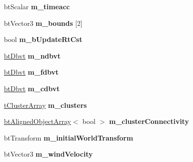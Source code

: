 \begin{DoxyCompactItemize}
\item 
\hypertarget{classbt_soft_body_a3be50e0cde03af244eb7103a45ed52c3}{bt\+Scalar {\bfseries m\+\_\+timeacc}}\label{classbt_soft_body_a3be50e0cde03af244eb7103a45ed52c3}

\item 
\hypertarget{classbt_soft_body_a8e821d5ed921ec7fe4919d39123d1022}{bt\+Vector3 {\bfseries m\+\_\+bounds} \mbox{[}2\mbox{]}}\label{classbt_soft_body_a8e821d5ed921ec7fe4919d39123d1022}

\item 
\hypertarget{classbt_soft_body_a04af20a0326f6ebe8cf0901beb39c2fa}{bool {\bfseries m\+\_\+b\+Update\+Rt\+Cst}}\label{classbt_soft_body_a04af20a0326f6ebe8cf0901beb39c2fa}

\item 
\hypertarget{classbt_soft_body_aff100eec6044f78bbc4f7e5ccf4619d3}{\hyperlink{structbt_dbvt}{bt\+Dbvt} {\bfseries m\+\_\+ndbvt}}\label{classbt_soft_body_aff100eec6044f78bbc4f7e5ccf4619d3}

\item 
\hypertarget{classbt_soft_body_ab4ca8f3ddef99e2068818d6fabbad321}{\hyperlink{structbt_dbvt}{bt\+Dbvt} {\bfseries m\+\_\+fdbvt}}\label{classbt_soft_body_ab4ca8f3ddef99e2068818d6fabbad321}

\item 
\hypertarget{classbt_soft_body_a108b2be76b7647b2138d99e99b3bbdb0}{\hyperlink{structbt_dbvt}{bt\+Dbvt} {\bfseries m\+\_\+cdbvt}}\label{classbt_soft_body_a108b2be76b7647b2138d99e99b3bbdb0}

\item 
\hypertarget{classbt_soft_body_a9579ec7fb7f43787cf4bc74eed279f48}{\hyperlink{classbt_aligned_object_array}{t\+Cluster\+Array} {\bfseries m\+\_\+clusters}}\label{classbt_soft_body_a9579ec7fb7f43787cf4bc74eed279f48}

\item 
\hypertarget{classbt_soft_body_a2a7ce6797345d0b068b2d2bab2db0ff3}{\hyperlink{classbt_aligned_object_array}{bt\+Aligned\+Object\+Array}$<$ bool $>$ {\bfseries m\+\_\+cluster\+Connectivity}}\label{classbt_soft_body_a2a7ce6797345d0b068b2d2bab2db0ff3}

\item 
\hypertarget{classbt_soft_body_a62f3be93755bd2e1f30bed79a9f72cac}{bt\+Transform {\bfseries m\+\_\+initial\+World\+Transform}}\label{classbt_soft_body_a62f3be93755bd2e1f30bed79a9f72cac}

\item 
\hypertarget{classbt_soft_body_ad02496af28d6bf408a736ee3e5f05c32}{bt\+Vector3 {\bfseries m\+\_\+wind\+Velocity}}\label{classbt_soft_body_ad02496af28d6bf408a736ee3e5f05c32}


\end{DoxyCompactItemize}
